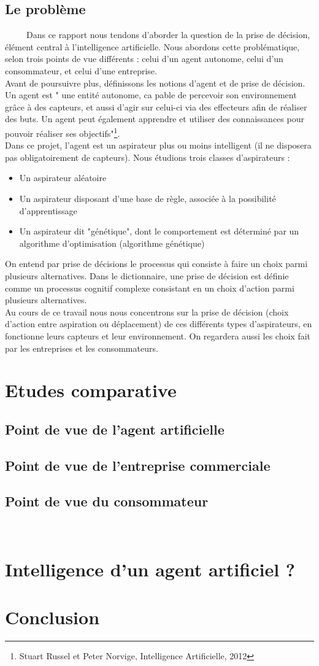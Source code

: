 \documentclass[a4paper,12pt]{report}
\begin{document}
\subsection{Le problème}
\ \ \ \ \ Dans ce rapport nous tendons d'aborder la question de la prise de décision, élément central à l'intelligence artificielle. Nous abordons cette problématique, selon trois points de vue différents : celui d'un agent autonome, celui d'un consommateur, et celui d'une entreprise. \\
Avant de poursuivre plus, définissons les notions d'agent et de prise de décision. \\
Un agent est " une entité autonome, ca pable de percevoir son environnement grâce à des capteurs, et aussi d'agir sur celui-ci via des effecteurs afin de réaliser des buts. Un agent peut également apprendre et utiliser des connaissances pour pouvoir réaliser ses objectifs"\footnote{Stuart Russel et Peter Norvige, Intelligence Artificielle, 2012}.\\
Dans ce projet, l'agent est un aspirateur plus ou moins intelligent (il ne disposera pas obligatoirement de capteurs). Nous étudions trois classes d'aspirateurs : 
\begin{itemize}
\item Un aspirateur aléatoire
\item Un aspirateur disposant d'une base de règle, associée à la possibilité d'apprentissage
\item Un aspirateur dit "génétique", dont le comportement est déterminé par un algorithme d'optimisation (algorithme génétique)
\end{itemize}
On entend par prise de décisions le processus qui consiste à faire un choix parmi plusieurs alternatives.
Dans le dictionnaire, une prise de décision est définie comme un processus cognitif complexe consistant en un choix d'action parmi plusieurs alternatives. \\
Au cours de ce travail nous nous concentrons sur la prise de décision (choix d'action entre aspiration ou déplacement) de ces différents types d'aspirateurs, en fonctionne leurs capteurs et leur environnement. On regardera aussi les choix fait par les entreprises et les consommateurs. 
\section{Etudes comparative}
\subsection{Point de vue de l'agent artificielle }
\subsection{Point de vue de l'entreprise commerciale}
\subsection{Point de vue du consommateur}
\ \ \ \ 

\section{Intelligence d'un agent artificiel ? }

\section{Conclusion}
\end{document}
